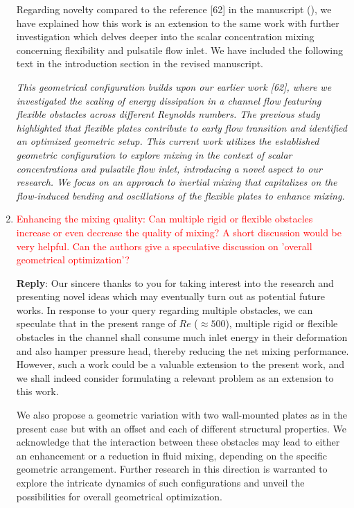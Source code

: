 \documentclass[onecolumn,a4paper,amsmath,amssym,pre]{revtex4}
\begin{document}
\begin{enumerate}
					Regarding novelty compared to the reference [62] in the manuscript (\cite{Self2019}), we have explained how this work is an extension to the same work with further investigation which delves deeper into the scalar concentration mixing concerning flexibility and pulsatile flow inlet. We have included the following text in the introduction section in the revised manuscript.
					
					\textit{This geometrical configuration builds upon our earlier work [62], where we investigated the scaling of energy dissipation in a channel flow featuring flexible obstacles across different Reynolds numbers. The previous study highlighted that flexible plates contribute to early flow transition and identified an optimized geometric setup. This current work utilizes the established geometric configuration to explore mixing in the context of scalar concentrations and pulsatile flow inlet, introducing a novel aspect to our research. We focus on an approach to inertial mixing that capitalizes on the flow-induced bending and oscillations of the flexible plates to enhance mixing.}
					
					
					\item \textcolor{red}{Enhancing the mixing quality:	Can multiple rigid or flexible obstacles increase or even decrease the quality of mixing? A short discussion would be very helpful. Can the authors give a speculative discussion on 'overall geometrical optimization'?}
					
					\textbf{Reply}: Our sincere thanks to you for taking interest into the research and presenting novel ideas which may eventually turn out as potential future works. In response to your query regarding multiple obstacles, we can speculate that in the present range of $Re$ ($\approx500$), multiple rigid or flexible obstacles in the channel shall consume much inlet energy in their deformation and also hamper pressure head, thereby reducing the net mixing performance. However, such a work could be a valuable extension to the present work, and we shall indeed consider formulating a relevant problem as an extension to this work. 
					
					We also propose a geometric variation with two wall-mounted plates as in the present case but with an offset and each of different structural properties. We acknowledge that the interaction between these obstacles may lead to either an enhancement or a reduction in fluid mixing, depending on the specific geometric arrangement. Further research in this direction is warranted to explore the intricate dynamics of such configurations and unveil the possibilities for overall geometrical optimization.
					

\end{enumerate}
\end{document}
